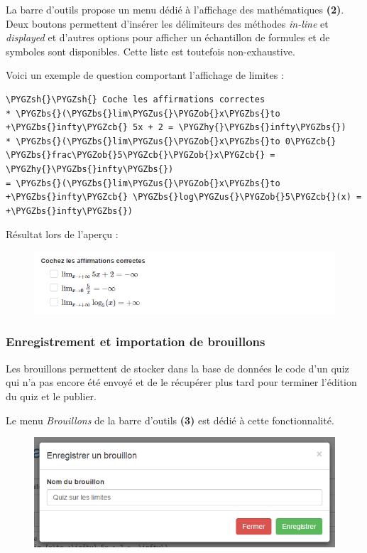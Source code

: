\documentclass[a4,10pt,french]{sphinxmanual}
\def\PYGZbs{\char`\\}
\def\PYGZus{\char`\_}
\def\PYGZob{\char`\{}
\def\PYGZcb{\char`\}}
\def\PYGZsh{\char`\#}
\def\PYGZhy{\char`\-}
\begin{document}
La barre d'outils propose un menu dédié à l'affichage des mathématiques \textbf{(2)}. Deux boutons permettent d'insérer les délimiteurs des méthodes \emph{in-line} et \emph{displayed} et d'autres options pour afficher un échantillon de formules et de symboles sont disponibles. Cette liste est toutefois non-exhaustive.

Voici un exemple de question comportant l'affichage de limites :

\begin{Verbatim}[commandchars=\\\{\}]
\PYGZsh{}\PYGZsh{} Coche les affirmations correctes
* \PYGZbs{}(\PYGZbs{}lim\PYGZus{}\PYGZob{}x\PYGZbs{}to +\PYGZbs{}infty\PYGZcb{} 5x + 2 = \PYGZhy{}\PYGZbs{}infty\PYGZbs{})
* \PYGZbs{}(\PYGZbs{}lim\PYGZus{}\PYGZob{}x\PYGZbs{}to 0\PYGZcb{} \PYGZbs{}frac\PYGZob{}5\PYGZcb{}\PYGZob{}x\PYGZcb{} = \PYGZhy{}\PYGZbs{}infty\PYGZbs{})
= \PYGZbs{}(\PYGZbs{}lim\PYGZus{}\PYGZob{}x\PYGZbs{}to +\PYGZbs{}infty\PYGZcb{} \PYGZbs{}log\PYGZus{}\PYGZob{}5\PYGZcb{}(x) = +\PYGZbs{}infty\PYGZbs{})
\end{Verbatim}

Résultat lors de l'aperçu :
\begin{figure}[htbp]
\centering

\includegraphics{checkbox.png}
\end{figure}


\subsubsection{Enregistrement et importation de brouillons}
\label{doc-user:enregistrement-et-importation-de-brouillons}
Les brouillons permettent de stocker dans la base de données le code d'un quiz qui n'a pas encore été envoyé et de le récupérer plus tard pour terminer l'édition du quiz et le publier.

Le menu \emph{Brouillons} de la barre d'outils \textbf{(3)} est dédié à cette fonctionnalité.
\begin{figure}[htbp]
\centering

\includegraphics{draft-save.png}
\end{figure}
\end{document}
